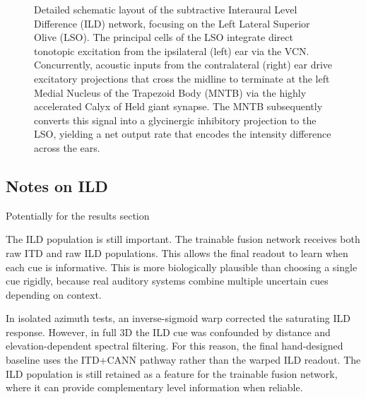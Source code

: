 \begin{figure}[htbp]
    \caption{Detailed schematic layout of the subtractive Interaural Level Difference (ILD) network, focusing on the Left Lateral Superior Olive (LSO). The principal cells of the LSO integrate direct tonotopic excitation from the ipsilateral (left) ear via the VCN. Concurrently, acoustic inputs from the contralateral (right) ear drive excitatory projections that cross the midline to terminate at the left Medial Nucleus of the Trapezoid Body (MNTB) via the highly accelerated Calyx of Held giant synapse. The MNTB subsequently converts this signal into a glycinergic inhibitory projection to the LSO, yielding a net output rate that encodes the intensity difference across the ears.}
    \label{fig:lso_mntb_circuit}
\end{figure}



\subsection{Notes on ILD}

Potentially for the results section

The ILD population is still important. The trainable fusion network receives both raw ITD and raw ILD populations. This allows the final readout to learn when each cue is informative. This is more biologically plausible than choosing a single cue rigidly, because real auditory systems combine multiple uncertain cues depending on context.


In isolated azimuth tests, an inverse-sigmoid warp corrected the saturating ILD response. However, in full 3D the ILD cue was confounded by distance and elevation-dependent spectral filtering. For this reason, the final hand-designed baseline uses the ITD+CANN pathway rather than the warped ILD readout. The ILD population is still retained as a feature for the trainable fusion network, where it can provide complementary level information when reliable.